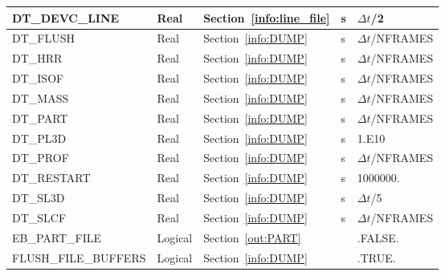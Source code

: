 \documentclass[11pt]{book}
\begin{document}
\begin{longtable}{@{\extracolsep{\fill}}|l|l|l|l|l|}
{\ct DT\_DEVC\_LINE}                & Real         & Section~\ref{info:line_file}           &  s        & $\Delta t${\ct /2}             \\ \hline
{\ct DT\_FLUSH}                     & Real         & Section~\ref{info:DUMP}                &  s        & $\Delta t${\ct /NFRAMES}       \\ \hline
{\ct DT\_HRR}                       & Real         & Section~\ref{info:DUMP}                &  s        & $\Delta t${\ct /NFRAMES}       \\ \hline
{\ct DT\_ISOF}                      & Real         & Section~\ref{info:DUMP}                &  s        & $\Delta t${\ct /NFRAMES}       \\ \hline
{\ct DT\_MASS}                      & Real         & Section~\ref{info:DUMP}                &  s        & $\Delta t${\ct /NFRAMES}       \\ \hline
{\ct DT\_PART}                      & Real         & Section~\ref{info:DUMP}                &  s        & $\Delta t${\ct /NFRAMES}       \\ \hline
{\ct DT\_PL3D}                      & Real         & Section~\ref{info:DUMP}                &  s        & 1.E10                          \\ \hline
{\ct DT\_PROF}                      & Real         & Section~\ref{info:DUMP}                &  s        & $\Delta t${\ct /NFRAMES}       \\ \hline
{\ct DT\_RESTART}                   & Real         & Section~\ref{info:DUMP}                &  s        & 1000000.                       \\ \hline
{\ct DT\_SL3D}                      & Real         & Section~\ref{info:DUMP}                &  s        & $\Delta t${\ct /5}             \\ \hline
{\ct DT\_SLCF}                      & Real         & Section~\ref{info:DUMP}                &  s        & $\Delta t${\ct /NFRAMES}       \\ \hline
{\ct EB\_PART\_FILE}                & Logical      & Section~\ref{out:PART}                 &           & {\ct .FALSE.}                  \\ \hline
{\ct FLUSH\_FILE\_BUFFERS}          & Logical      & Section~\ref{info:DUMP}                &           & {\ct .TRUE.}                   \\ \hline

\end{longtable}
\end{document}
